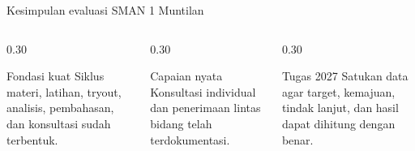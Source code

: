 \begin{frame}{Kesimpulan evaluasi SMAN 1 Muntilan}
  \begin{columns}[T,onlytextwidth]
    \begin{column}{0.30\textwidth}
      \begin{block}{Fondasi kuat}
        Siklus materi, latihan, tryout, analisis, pembahasan, dan konsultasi sudah terbentuk.
      \end{block}
    \end{column}
    \begin{column}{0.30\textwidth}
      \begin{block}{Capaian nyata}
        Konsultasi individual dan penerimaan lintas bidang telah terdokumentasi.
      \end{block}
    \end{column}
    \begin{column}{0.30\textwidth}
      \begin{block}{Tugas 2027}
        Satukan data agar target, kemajuan, tindak lanjut, dan hasil dapat dihitung dengan benar.
      \end{block}
    \end{column}
  \end{columns}
  \vspace{0.28cm}
\end{frame}
